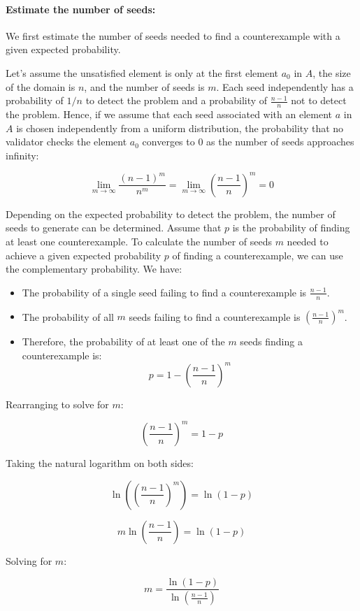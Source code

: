 \documentclass[runningheads]{llncs}
\begin{document}
\paragraph{Estimate the number of seeds:} We first estimate the number of seeds needed to find a counterexample with a given expected probability. 

Let's assume the unsatisfied element is only at the first element $a_0$ in $A$, the size of the domain is $n$, and the number of seeds is $m$. Each seed independently has a probability of $1/n$ to detect the problem and a probability of $\frac{n-1}{n}$ not to detect the problem. Hence, if we assume that each seed associated with an element $a$ in $A$ is chosen independently from a uniform distribution, the probability that no validator checks the element $a_0$ converges to $0$ as the number of seeds approaches infinity:

\[
  \lim_{m \to \infty} \frac{(n-1)^m}{n^m} = \lim_{m \to \infty} \left( \frac{n-1}{n} \right)^m = 0
\]

Depending on the expected probability to detect the problem, the number of seeds to generate can be determined. Assume that $p$ is the probability of finding at least one counterexample. To calculate the number of seeds $m$ needed to achieve a given expected probability $p$ of finding a counterexample, we can use the complementary probability. We have:
\begin{itemize}
\item The probability of a single seed failing to find a counterexample is $\frac{n-1}{n}$.
\item The probability of all $m$ seeds failing to find a counterexample is $\left(\frac{n-1}{n}\right)^m$.
\item Therefore, the probability of at least one of the $m$ seeds finding a counterexample is:
\[
p = 1 - \left(\frac{n-1}{n}\right)^m
\]
\end{itemize}  

Rearranging to solve for \( m \):

\[
\left(\frac{n-1}{n}\right)^m = 1 - p
\]

Taking the natural logarithm on both sides:

\[
\ln\left(\left(\frac{n-1}{n}\right)^m\right) = \ln(1 - p)
\]

\[
m \ln\left(\frac{n-1}{n}\right) = \ln(1 - p)
\]

Solving for \( m \):

\[
m = \frac{\ln(1 - p)}{\ln\left(\frac{n-1}{n}\right)}
\]
\end{document}

